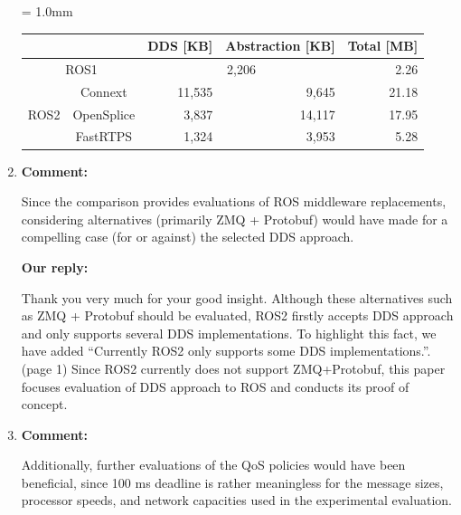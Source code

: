 \documentclass{article}
\begin{document}
\begin{enumerate}
\begin{table}[H]
    \renewcommand{\arraystretch}{1.15}
    \label{tb:memory}
    \small
    \tabcolsep = 1.0mm              %
    \begin{tabular}{c|c||r|r||r}
      \hline
      \multicolumn{2}{c||}{} & DDS [KB] & Abstraction [KB] & Total [MB] \\ \hline \hline
      \multicolumn{2}{c||}{ROS1}  & \multicolumn{2}{c||}{ 2,206 } & 2.26 \\ \hline
      \multirow{3}{*}{ROS2} & Connext & 11,535 & 9,645 & 21.18 \\ 
      & OpenSplice & 3,837 & 14,117 & 17.95 \\ 
      & FastRTPS & 1,324 & 3,953 & 5.28\\ \hline
    \end{tabular}
  \end{table}

\item \begin{flushleft}
  \textbf{Comment:}
\end{flushleft}
  Since the comparison provides evaluations of ROS middleware replacements, considering alternatives (primarily ZMQ + Protobuf) would have made for a compelling case (for or against) the selected DDS approach.

  \begin{flushleft}
    \textbf{Our reply:}
  \end{flushleft}
  Thank you very much for your good insight. 
  Although these alternatives such as ZMQ + Protobuf should be evaluated, ROS2 firstly accepts DDS approach and only supports several DDS implementations.
  To highlight this fact, we have added ``Currently ROS2 only supports some DDS implementations.''. (page 1)
  Since ROS2 currently does not support ZMQ+Protobuf, this paper focuses evaluation of DDS approach to ROS and conducts its proof of concept.
  
\item \begin{flushleft}
  \textbf{Comment:}
\end{flushleft}
  Additionally, further evaluations of the QoS policies would have been beneficial, since 100 ms deadline is rather meaningless for the message sizes, processor speeds, and network capacities used in the experimental evaluation.


\end{enumerate}
\end{document}

